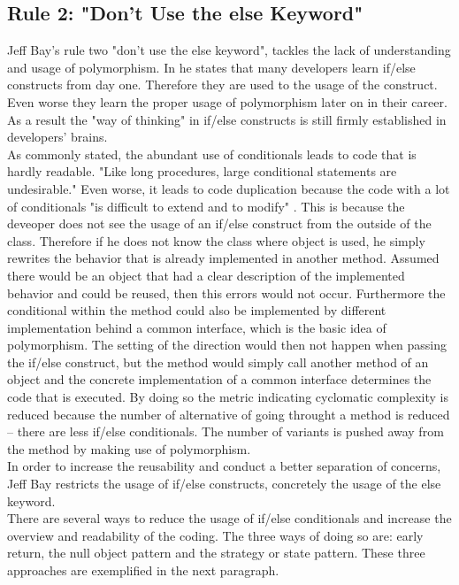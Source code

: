 \subsection*{Rule 2: "Don’t Use the else Keyword"}
\label{describe:rule2}
Jeff Bay's rule two "don’t use the else keyword", tackles the lack of understanding and usage of polymorphism. 
In \cite{oc2008} he states that many developers learn if/else constructs from day one. Therefore they are used to the usage of the construct. Even worse they learn the proper usage of polymorphism later on in their career. As a result the "way of thinking" in if/else constructs is still firmly established in developers' brains.
\\

As commonly stated, the abundant use of conditionals leads to code that is hardly readable\cite{gof}. "Like long procedures, large conditional statements are undesirable." \cite{gof} Even worse, it leads to code duplication because the code with a lot of conditionals "is difficult to extend and to modify" \cite{gof}. This is because the deveoper does not see the usage of an if/else construct from the outside of the class. Therefore if he does not know the class where object is used, he simply rewrites the behavior that is already implemented in another method. Assumed there would be an object that had a clear description of the implemented behavior and could be reused, then this errors would not occur. Furthermore the conditional within the method could also be implemented by different implementation behind a common interface, which is the basic idea of polymorphism. The setting of the direction would then not happen when passing the if/else construct, but the method would simply call another method of an object and the concrete implementation of a common interface determines the code that is executed. By doing so the metric indicating cyclomatic complexity is reduced because the number of alternative of going throught a method is reduced -- there are less if/else conditionals. The number of variants is pushed away from the method by making use of polymorphism.
\\

In order to increase the reusability and conduct a better separation of concerns, Jeff Bay restricts the usage of if/else constructs, concretely the usage of the else keyword.
\\

There are several ways to reduce the usage of if/else conditionals and increase the overview and readability of the coding. The three ways of doing so are: early return, the null object pattern and the strategy or state pattern. These three approaches are exemplified in the next paragraph. 

